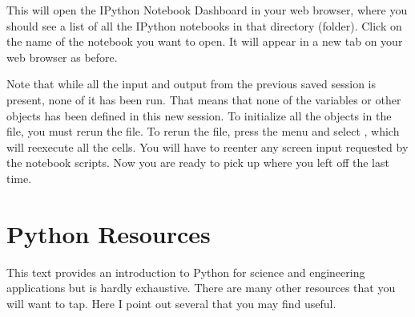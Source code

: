 \documentclass[letterpaper,10pt,english]{sphinxmanual}
\begin{document}
\sphinxAtStartPar
This will open the IPython Notebook Dashboard in your web browser, where you should see a list of all the IPython notebooks in that directory (folder).  Click on the name of the notebook you want to open.  It will appear in a new tab on your web browser as before.

\sphinxAtStartPar
Note that while all the input and output from the previous saved session is present, none of it has been run.  That means that none of the variables or other objects has been defined in this new session.  To initialize all the objects in the file, you must rerun the file.  To rerun the file, press the  menu and select , which will re\sphinxhyphen{}execute all the cells.  You will have to re\sphinxhyphen{}enter any screen input requested by the notebook scripts.  Now you are ready to pick up where you left off the last time.
\label{\detokenize{apdx3/apdx3_resources::doc}}

\chapter{Python Resources}
\label{\detokenize{apdx3/apdx3_resources:python-resources}}\label{\detokenize{apdx3/apdx3_resources:apdx2}}
\sphinxAtStartPar
This text provides an introduction to Python for science and engineering applications but is hardly exhaustive.  There are many other resources that you will want to tap.  Here I point out several that you may find useful.
\end{document}
